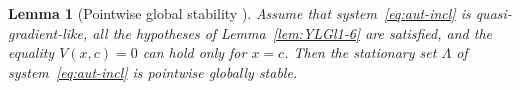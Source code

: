 \documentclass[journal]{IEEEtran}
\theoremstyle{myplain}
\newtheorem{theorem}{Theorem}
\newtheorem{lemma}{Lemma}
\begin{document}
\begin{lemma}[Pointwise global stability {\cite[Lem.~1.7]{YLG}}]\label{lem:YLGl1-7}
Assume that system~\eqref{eq:aut-incl} is quasi-gradient-like, all the
hypotheses of Lemma~\ref{lem:YLGl1-6} are satisfied, and the equality
$V(x,c)=0$ can hold only for $x=c$.
Then the stationary set $\Lambda$ of system~\eqref{eq:aut-incl} is
pointwise globally stable.
\end{lemma}





\end{document}
